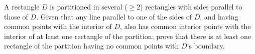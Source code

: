 A rectangle $ D$ is partitioned in several ($ \ge2$) rectangles with sides parallel to those of $ D$. Given that any line parallel to one of the sides of $ D$,  and having common points with the interior of $ D$,  also has common interior points with the interior of at least one rectangle of the partition; prove that there is at least one rectangle of the partition having no common points with $ D$'s boundary.